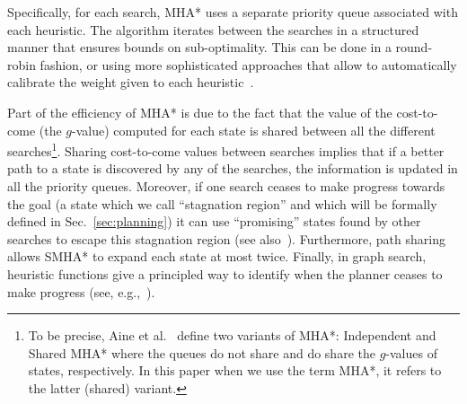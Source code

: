 \documentclass{article}
\begin{document}
Specifically, for each search, MHA* uses a separate priority queue associated with each heuristic. 
The algorithm iterates between the searches in a structured manner that ensures bounds on sub-optimality. 
This can be done in a round-robin fashion, or using more 
sophisticated approaches that allow to automatically calibrate the weight given to each heuristic~\cite{PNAL15}.

Part of the efficiency of MHA* is due to the fact that the value of the cost-to-come (the $g$-value) computed for each state is shared between all the different searches\footnote{To be precise, Aine et al.~\cite{ASNHL16} define two variants of MHA*: Independent and Shared MHA* where the queues do not share and do share the $g$-values of states, respectively. In this paper when we use the term MHA*, it refers to the latter (shared) variant.}.
Sharing cost-to-come values between searches implies that if a better path to a state is discovered by any of the searches, the information is updated in all the
priority queues. 
Moreover, if one search ceases to make progress towards the goal (a state which we call ``stagnation region'' and which will be formally defined in Sec.~\ref{sec:planning}) it can use ``promising'' states found by other searches to escape this stagnation region (see also~\cite{HB12,I92}).
Furthermore, path sharing allows SMHA* to expand each state at most twice.
Finally, in graph search, heuristic functions give a principled way to identify when the planner ceases to make progress (see, e.g.,~\cite{VNL17}).



\end{document}
